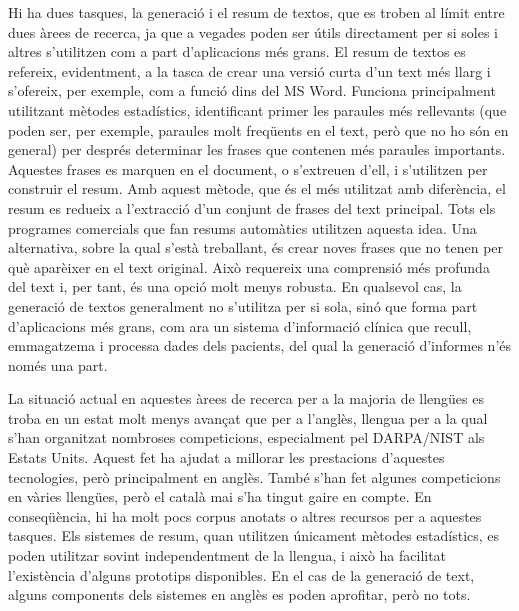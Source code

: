 \begin{multicols}{2}

Hi ha dues tasques, la generació i el resum de textos, que es troben al límit entre dues àrees de recerca, ja que a vegades poden ser útils directament per si soles i altres s’utilitzen com a part d’aplicacions més grans. El resum de textos es refereix, evidentment, a la tasca de crear una versió curta d’un text més llarg i s’ofereix, per exemple, com a funció dins del MS Word. Funciona principalment utilitzant mètodes estadístics, identificant primer les paraules més rellevants (que poden ser, per exemple, paraules molt freqüents en el text, però que no ho són en general) per després determinar les frases que contenen més paraules importants. Aquestes frases es marquen en el document, o s’extreuen d’ell, i s’utilitzen per construir el resum. Amb aquest mètode, que és el més utilitzat amb diferència, el resum es redueix a l’extracció d’un conjunt de frases del text principal. Tots els programes comercials que fan resums automàtics utilitzen aquesta idea. Una alternativa, sobre la qual s’està treballant, és crear noves frases que no tenen per què aparèixer en el text original. Això requereix una comprensió més profunda del text i, per tant, és una opció molt menys robusta. En qualsevol cas, la generació de textos generalment no s’utilitza per si sola, sinó que forma part d’aplicacions més grans, com ara un sistema d’informació clínica que recull, emmagatzema i processa dades dels pacients, del qual la generació d’informes n’és només una part. 


La situació actual en aquestes àrees de recerca per a la majoria de llengües es troba en un estat molt menys avançat que per a l’anglès, llengua per a la qual s’han organitzat nombroses competicions, especialment pel DARPA/NIST als Estats Units. Aquest fet ha ajudat a millorar les prestacions d’aquestes tecnologies, però principalment en anglès. També s’han fet algunes competicions en vàries llengües, però el català mai s’ha tingut gaire en compte. En conseqüència, hi ha molt pocs corpus anotats o altres recursos per a aquestes tasques. Els sistemes de resum, quan utilitzen únicament mètodes estadístics, es poden utilitzar sovint independentment de la llengua, i això ha facilitat l’existència d’alguns prototips disponibles. En el cas de la generació de text, alguns components dels sistemes en anglès es poden aprofitar, però no tots. 


\end{multicols}

